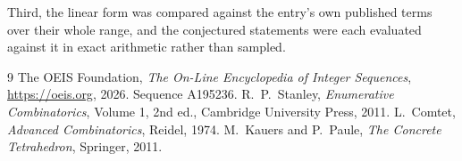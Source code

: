 \documentclass[11pt,a4paper]{article}
\theoremstyle{plain}
\theoremstyle{definition}
\begin{document}
Third, the linear form was compared against the entry's own published terms over their whole
range, and the conjectured statements were each evaluated against it in exact arithmetic
rather than sampled.

\begin{thebibliography}{9}
 The OEIS Foundation, \emph{The On-Line Encyclopedia of Integer
Sequences}, \url{https://oeis.org}, 2026. Sequence A195236.
 R.~P.~Stanley, \emph{Enumerative Combinatorics}, Volume 1, 2nd ed.,
Cambridge University Press, 2011.
 L.~Comtet, \emph{Advanced Combinatorics}, Reidel, 1974.
 M.~Kauers and P.~Paule, \emph{The Concrete Tetrahedron}, Springer, 2011.
\end{thebibliography}
\end{document}
